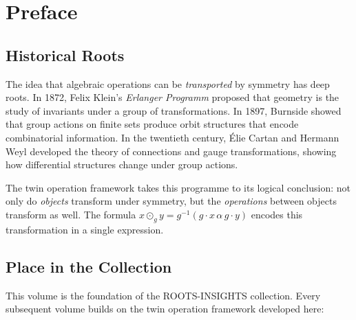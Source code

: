 \documentclass[11pt,a4paper,openany]{book}
\theoremstyle{plain}
\theoremstyle{definition}
\newcommand{\twing}[1]{\odot_{#1}}
\begin{document}
\cleardoublepage

\tableofcontents

\cleardoublepage


\mainmatter



\chapter*{Preface}

\section*{Historical Roots}

The idea that algebraic operations can be \emph{transported} by symmetry has deep roots. In 1872, Felix Klein's \emph{Erlanger Programm} proposed that geometry is the study of invariants under a group of transformations. In 1897, Burnside showed that group actions on finite sets produce orbit structures that encode combinatorial information. In the twentieth century, Élie Cartan and Hermann Weyl developed the theory of connections and gauge transformations, showing how differential structures change under group actions.

The twin operation framework takes this programme to its logical conclusion: not only do \emph{objects} transform under symmetry, but the \emph{operations} between objects transform as well. The formula $x \twing{g} y = g^{-1}(g \cdot x \,\alpha\, g \cdot y)$ encodes this transformation in a single expression.

\section*{Place in the Collection}

This volume is the foundation of the ROOTS-INSIGHTS collection. Every subsequent volume builds on the twin operation framework developed here:
\end{document}
